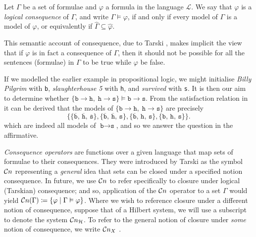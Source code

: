 \begin{definition}
     \label{definition:logical-consequence}
     Let $\Gamma$ be a set of formulae and $\varphi$ a formula in the language $\mathcal{L}$. We say that $\varphi$ is a \textit{logical consequence} of $\Gamma$, and write $\Gamma \vDash \varphi$, if and only if every model of $\Gamma$ is a model of $\varphi$, or equivalently if $\hat{\Gamma} \subseteq \hat{\varphi}$.
\end{definition}

This semantic account of consequence, due to Tarski \cite[p. 417]{tarski1936consequence}, makes implicit the view that if $\varphi$ is in fact a consequence of $\Gamma$, then it should not be possible for all the sentences (formulae) in $\Gamma$ to be true while $\varphi$ be false.

\begin{example}
     \label{example-logical-consequence}
     If we modelled the earlier example in propositional logic, we might initialise \textit{Billy Pilgrim} with \texttt{b}, \textit{slaughterhouse 5} with \texttt{h}, and \textit{survived} with \texttt{s}. It is then our aim to determine whether $\{\texttt{b} \rightarrow \texttt{h},\; \texttt{h} \rightarrow \texttt{s}\} \vDash \texttt{b} \rightarrow \texttt{s}$. From the satisfaction relation in  it can be derived that the models of $\{\texttt{b} \rightarrow \texttt{h},\; \texttt{h} \rightarrow \texttt{s}\}$ are precisely
\[
     \bigl\{
       \{\overline{\texttt{b}},\,\overline{\texttt{h}},\,\overline{\texttt{s}}\},
       \{\overline{\texttt{b}},\,\overline{\texttt{h}},\,{\texttt{s}}\},
       \{\overline{\texttt{b}},\,{\texttt{h}},\,{\texttt{s}}\},
       \{{\texttt{b}},\,{\texttt{h}},\,{\texttt{s}}\}
     \bigr\}.
\]
which are indeed all models of $\texttt{b} \rightarrow \texttt{s}$, and so we answer the question in the affirmative.
\end{example}

\textit{Consequence operators} are functions over a given language that map sets of formulae to their consequences. They were introduced by Tarski \cite[p. 84]{tarski1936operator} as the symbol $\mathcal{C}n$ representing a \textit{general} idea that sets can be closed under a specified notion consequence. In future, we use $\mathcal{C}n$ to refer specifically to closure under logical (Tarskian) consequence; and so, application of the $\mathcal{C}n$ operator to a set $\Gamma$ would yield $\mathcal{C}n (\Gamma) \coloneqq \{\varphi \mid \Gamma \vDash \varphi\}$. Where we wish to reference closure under a different notion of consequence, suppose that of a Hilbert system, we will use a subscript to denote the system $\mathcal{C}n_\mathcal{H}$. To refer to the general notion of closure under \textit{some} notion of consequence, we write $\mathcal{C}n_X$ \cite[p. 4]{citkin2022consequence}.

